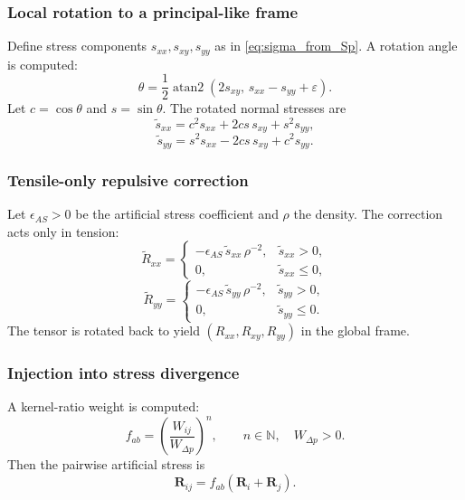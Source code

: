\documentclass[11pt]{article}
\begin{document}
\subsubsection{Local rotation to a principal-like frame}

Define stress components $s_{xx},s_{xy},s_{yy}$ as in \eqref{eq:sigma_from_Sp}. A rotation angle is computed:
\begin{equation}
\theta = \frac12 \operatorname{atan2}\!\left(2s_{xy},\,s_{xx}-s_{yy}+\varepsilon\right).
\label{eq:theta}
\end{equation}
Let $c=\cos\theta$ and $s=\sin\theta$. The rotated normal stresses are
\begin{equation}
\tilde{s}_{xx}=c^2 s_{xx}+2cs\,s_{xy}+s^2 s_{yy},
\label{eq:rot_sxx}
\end{equation}
\begin{equation}
\tilde{s}_{yy}=s^2 s_{xx}-2cs\,s_{xy}+c^2 s_{yy}.
\label{eq:rot_syy}
\end{equation}

\subsubsection{Tensile-only repulsive correction}

Let $\epsilon_{AS}>0$ be the artificial stress coefficient and $\rho$ the density. The correction acts only in tension:
\begin{equation}
\tilde{R}_{xx}=
\begin{cases}
-\epsilon_{AS}\,\tilde{s}_{xx}\,\rho^{-2}, & \tilde{s}_{xx}>0,\\
0, & \tilde{s}_{xx}\le 0,
\end{cases}
\label{eq:Rxx_tilde}
\end{equation}
\begin{equation}
\tilde{R}_{yy}=
\begin{cases}
-\epsilon_{AS}\,\tilde{s}_{yy}\,\rho^{-2}, & \tilde{s}_{yy}>0,\\
0, & \tilde{s}_{yy}\le 0.
\end{cases}
\label{eq:Ryy_tilde}
\end{equation}
The tensor is rotated back to yield $(R_{xx},R_{xy},R_{yy})$ in the global frame.

\subsubsection{Injection into stress divergence}

A kernel-ratio weight is computed:
\begin{equation}
f_{ab}=\left(\frac{W_{ij}}{W_{\Delta p}}\right)^{n},
\qquad n\in\mathbb{N},\quad W_{\Delta p}>0.
\label{eq:fab}
\end{equation}
Then the pairwise artificial stress is
\begin{equation}
\bm{R}_{ij}=f_{ab}\left(\bm{R}_i+\bm{R}_j\right).
\label{eq:Rij}
\end{equation}
\end{document}
